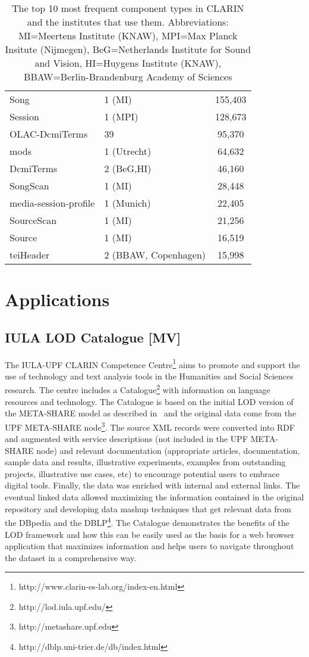 \documentclass{llncs}
\begin{document}
{\begin{table}
\begin{center}
\begin{tabular}{l|lc}
\hline
Song & 1 (MI) & 155,403 \\
Session & 1 (MPI) & 128,673 \\
OLAC-DcmiTerms & 39 & 95,370 \\
mods & 1 (Utrecht)& 64,632 \\
DcmiTerms & 2 (BeG,HI) & 46,160 \\
SongScan & 1 (MI) & 28,448 \\
media-session-profile & 1 (Munich) & 22,405 \\
SourceScan & 1 (MI) & 21,256 \\
Source & 1 (MI) & 16,519 \\
teiHeader & 2 (BBAW, Copenhagen) & 15,998 \\
\end{tabular}
\end{center}
\caption{\label{tab:clarin-types}The top 10 most frequent component types in
CLARIN and the institutes that use them. Abbreviations: MI=Meertens Institute (KNAW),
MPI=Max Planck Insitute (Nijmegen), BeG=Netherlands Institute for Sound and Vision,
HI=Huygens Institute (KNAW), BBAW=Berlin-Brandenburg Academy of Sciences}
\end{table}
\section{Applications}
\label{sec:applications}
\subsection{IULA LOD Catalogue [MV]}
\label{sec:iulalod}
The IULA-UPF CLARIN Competence Centre\footnote{http://www.clarin-es-lab.org/index-en.html} aims to promote and support the use of technology and text analysis tools in the Humanities and Social Sciences research. The centre includes a Catalogue\footnote{http://lod.iula.upf.edu/} with information on language resources and technology. The Catalogue is based on the initial LOD version of the META-SHARE model as described in~\cite{Villegas2014} and the original data come from the UPF META-SHARE node\footnote{http://metashare.upf.edu}. The source XML records were converted into RDF and augmented with service descriptions (not included in the UPF META-SHARE node) and relevant documentation (appropriate articles, documentation, sample data and results, illustrative experiments, examples from outstanding projects, illustrative use cases, etc) to encourage potential users to embrace digital tools. Finally, the data was enriched with internal and external links. The eventual linked data allowed maximizing the information
contained in the original repository and developing data mashup techniques that get relevant data from the DBpedia and the DBLP\footnote{http://dblp.uni-trier.de/db/index.html}. The Catalogue demonstrates the benefits of the LOD framework and how this can be easily used as the basis for a web browser application that maximizes information and helps users to navigate throughout the dataset in a comprehensive way.
}
\end{document}
